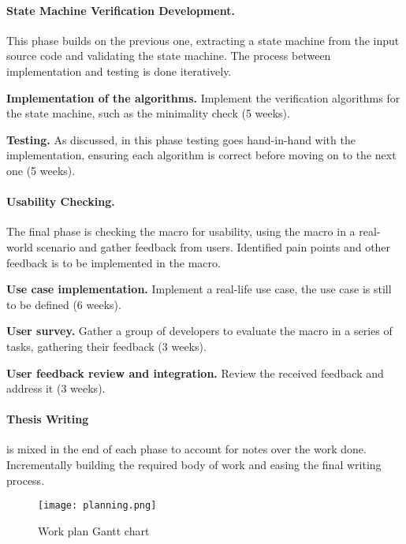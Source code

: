 \paragraph{State Machine Verification Development.}
This phase builds on the previous one, extracting a state machine from the input source code and validating the state machine.
The process between implementation and testing is done iteratively.
\begin{compactitem}
    \item \textbf{Implementation of the algorithms.} Implement the verification algorithms for the state machine, such as the minimality check (5 weeks).
    \item \textbf{Testing.} As discussed, in this phase testing goes hand-in-hand with the implementation, ensuring each algorithm is correct before moving on to the next one (5 weeks).
\end{compactitem}
\paragraph{Usability Checking.}
The final phase is checking the macro for usability, using the macro in a real-world scenario and gather feedback from users.
Identified pain points and other feedback is to be implemented in the macro.
\begin{compactitem}
    \item \textbf{Use case implementation.} Implement a real-life use case, the use case is still to be defined (6 weeks).
    \item \textbf{User survey.} Gather a group of developers to evaluate the macro in a series of tasks, gathering their feedback (3 weeks).
    \item \textbf{User feedback review and integration.} Review the received feedback and address it (3 weeks).
\end{compactitem}
\paragraph{Thesis Writing} is mixed in the end of each phase to account for notes over the work done.
Incrementally building the required body of work and easing the final writing process.

\begin{figure}[h]
    \centering
    \texttt{[image: planning.png]}
    \caption{Work plan Gantt chart}
\end{figure}